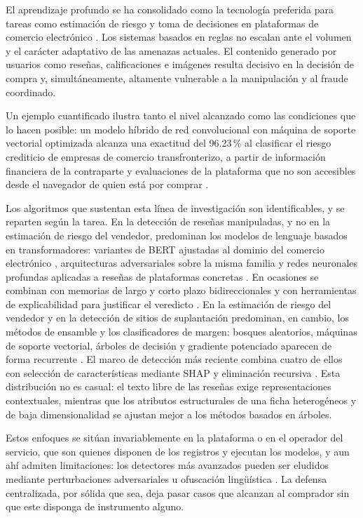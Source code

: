 El aprendizaje profundo se ha consolidado como la tecnología preferida para tareas como
estimación de riesgo y toma de decisiones en plataformas de comercio electrónico \cite{ref31}.
Los sistemas basados en reglas no escalan ante el volumen y el carácter adaptativo de las
amenazas actuales. El contenido generado por usuarios como reseñas, calificaciones e
imágenes resulta decisivo en la decisión de compra y, simultáneamente, altamente vulnerable a
la manipulación y al fraude coordinado.

Un ejemplo cuantificado ilustra tanto el nivel alcanzado como las condiciones que lo hacen
posible: un modelo híbrido de red convolucional con máquina de soporte vectorial optimizada
alcanza una exactitud del 96.23\,\% al clasificar el riesgo crediticio de empresas de comercio
transfronterizo, a partir de información financiera de la contraparte y evaluaciones de la
plataforma que no son accesibles desde el navegador de quien está por comprar \cite{ref32}.

Los algoritmos que sustentan esta línea de investigación son identificables, y se reparten
según la tarea. En la detección de reseñas manipuladas, y no en la estimación de riesgo del
vendedor, predominan los modelos de lenguaje basados en transformadores:
variantes de BERT ajustadas al dominio del comercio electrónico \cite{ref16}, arquitecturas
adversariales sobre la misma familia \cite{ref17} y redes neuronales profundas aplicadas a
reseñas de plataformas concretas \cite{ref18}. En ocasiones se combinan con memorias de largo
y corto plazo bidireccionales y con herramientas de explicabilidad para justificar el
veredicto \cite{ref16}. En la estimación de riesgo del vendedor y en la detección de sitios de
suplantación predominan, en cambio, los métodos de ensamble y los clasificadores de margen:
bosques aleatorios, máquinas de soporte vectorial, árboles de decisión y gradiente potenciado
aparecen de forma recurrente \cite{ref10, ref13, ref14}. El marco de detección más reciente
combina cuatro de ellos con selección de características mediante SHAP y eliminación recursiva
\cite{ref25}. Esta distribución no es casual: el texto libre de las reseñas exige
representaciones contextuales, mientras que los atributos estructurales de una ficha
heterogéneos y de baja dimensionalidad se ajustan mejor a los métodos basados en árboles.

Estos enfoques se sitúan invariablemente en la plataforma o en el operador del servicio, que
son quienes disponen de los registros y ejecutan los modelos, y aun ahí admiten limitaciones:
los detectores más avanzados pueden ser eludidos mediante perturbaciones adversariales u
ofuscación lingüística \cite{ref31}. La defensa centralizada, por sólida que sea, deja pasar
casos que alcanzan al comprador sin que este disponga de instrumento alguno.

